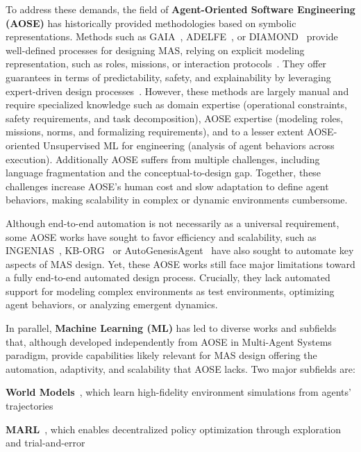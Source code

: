 \documentclass[pdflatex,sn-mathphys-num]{sn-jnl}%
\theoremstyle{thmstyleone}%
\theoremstyle{thmstyletwo}%
\theoremstyle{thmstylethree}%
\begin{document}
To address these demands, the field of \textbf{Agent-Oriented Software Engineering (AOSE)} has historically provided methodologies based on symbolic representations. Methods such as GAIA~\cite{gaia1998}, ADELFE~\cite{adelfe2002}, or DIAMOND~\cite{Jamont2007} provide well-defined processes for designing MAS, relying on explicit modeling representation, such as roles, missions, or interaction protocols~\cite{Pavon2003,Bernon1999}. They offer guarantees in terms of predictability, safety, and explainability by leveraging expert-driven design processes~\cite{Hindriks2014,Jamont2O15}. However, these methods are largely manual and require specialized knowledge such as domain expertise (operational constraints, safety requirements, and task decomposition), AOSE expertise (modeling roles, missions, norms, and formalizing requirements), and to a lesser extent AOSE-oriented Unsupervised ML for engineering (analysis of agent behaviors across execution). Additionally AOSE suffers from multiple challenges, including language fragmentation and the conceptual-to-design gap. Together, these challenges increase AOSE's human cost and slow adaptation to define agent behaviors, making scalability in complex or dynamic environments cumbersome.

Although end-to-end automation is not necessarily as a universal requirement, some AOSE works have sought to favor efficiency and scalability, such as INGENIAS~\cite{Pavon2003}, KB-ORG~\cite{Sims2008} or AutoGenesisAgent~\cite{harper2024autogenesisagent} have also sought to automate key aspects of MAS design.
Yet, these AOSE works still face major limitations toward a fully end-to-end automated design process. Crucially, they lack automated support for modeling complex environments as test environments, optimizing agent behaviors, or analyzing emergent dynamics.

In parallel, \textbf{Machine Learning (ML)} has led to diverse works and subfields that, although developed independently from AOSE in Multi-Agent Systems paradigm, provide capabilities likely relevant for MAS design offering the automation, adaptivity, and scalability that AOSE lacks. Two major subfields are:
\begin{enumerate*}[label={\roman*)}, itemjoin={; \quad}]
    \item \textbf{World Models}~\cite{Ha2018}, which learn high-fidelity environment simulations from agents’ trajectories
    \item \textbf{MARL}~\cite{Zhang2021, Papoudakis2021}, which enables decentralized policy optimization through exploration and trial-and-error
\end{enumerate*}
\end{document}
